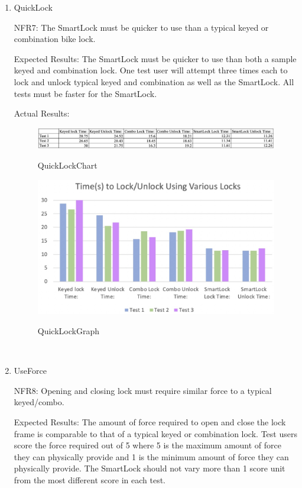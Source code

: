 \documentclass[12pt, titlepage]{article}
\begin{document}
\begin{enumerate}

\item{QuickLock

NFR7: The SmartLock must be quicker to use than a typical keyed or combination bike lock.  }

Expected Results: The SmartLock must be quicker to use than both a  sample keyed and combination lock. One test user will attempt three times each to lock and unlock typical keyed and combination as well as the SmartLock. All tests must be faster for the SmartLock.

Actual Results:


\begin{figure}[h!]
 \begin{center}
 {
 \includegraphics[width=1\linewidth]{QuickLockChart}
 }
 \caption{\label{QuickLockChart} QuickLockChart}
 \end{center}
 \end{figure}
 \begin{figure}[h!]
 \begin{center}
 {
 \includegraphics[width=1\linewidth]{QuickLockGraph}
 }
 \caption{\label{QuickLockGraph} QuickLockGraph}
 \end{center}
 \end{figure}

~\newpage
\item{UseForce

NFR8: Opening and closing lock must require similar force to a typical keyed/combo.  }

Expected Results: The amount of force required to open and close the lock frame is comparable to that of a typical keyed or combination lock. Test users score the force required out of 5 where 5 is the maximum amount of force they can physically provide and 1 is the minimum amount of force they can physically provide. The SmartLock should not vary more than 1 score unit from the most different score in each test. 


\end{enumerate}
\end{document}
